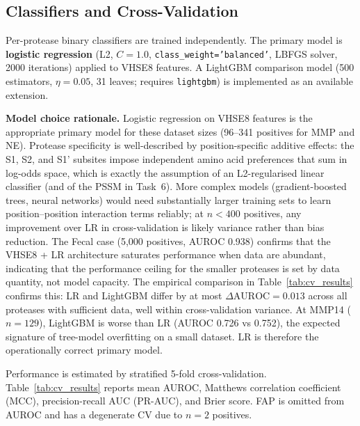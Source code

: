 \documentclass[10pt,a4paper]{article}
\begin{document}
\subsection{Classifiers and Cross-Validation}

Per-protease binary classifiers are trained independently. The primary model is
\textbf{logistic regression} (L2, $C = 1.0$, \texttt{class\_weight='balanced'},
LBFGS solver, 2000 iterations) applied to VHSE8 features. A LightGBM comparison model
(500 estimators, $\eta = 0.05$, 31 leaves; requires \texttt{lightgbm}) is implemented
as an available extension.

\textbf{Model choice rationale.} Logistic regression on VHSE8 features is the appropriate
primary model for these dataset sizes (96--341 positives for MMP and NE). Protease
specificity is well-described by position-specific additive effects: the S1, S2, and S1'
subsites impose independent amino acid preferences that sum in log-odds space, which is
exactly the assumption of an L2-regularised linear classifier (and of the PSSM in
Task~6). More complex models (gradient-boosted trees, neural networks) would need
substantially larger training sets to learn position--position interaction terms
reliably; at $n < 400$ positives, any improvement over LR in cross-validation is likely
variance rather than bias reduction. The Fecal case (5,000 positives, AUROC 0.938)
confirms that the VHSE8 + LR architecture saturates performance when data are abundant,
indicating that the performance ceiling for the smaller proteases is set by data quantity,
not model capacity. The empirical comparison in Table~\ref{tab:cv_results} confirms this:
LR and LightGBM differ by at most $\Delta\text{AUROC} = 0.013$ across all proteases with
sufficient data, well within cross-validation variance. At MMP14 ($n = 129$), LightGBM
is worse than LR (AUROC 0.726 vs 0.752), the expected signature of tree-model overfitting
on a small dataset. LR is therefore the operationally correct primary model.

Performance is estimated by stratified 5-fold cross-validation. Table~\ref{tab:cv_results}
reports mean AUROC, Matthews correlation coefficient (MCC), precision-recall AUC (PR-AUC),
and Brier score. FAP is omitted from AUROC and has a degenerate CV due to $n = 2$ positives.
\end{document}
